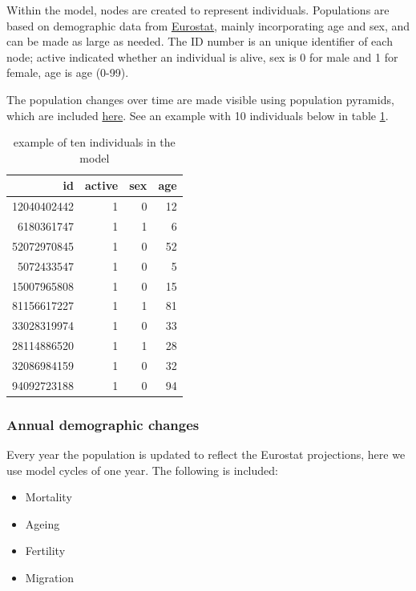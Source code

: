 \documentclass[
]{article}
\begin{document}
Within the model, nodes are created to represent individuals. Populations are based on demographic data from \href{https://ec.europa.eu/eurostat/home}{Eurostat}, mainly incorporating age and sex, and can be made as large as needed. The ID number is an unique identifier of each node; active indicated whether an individual is alive, sex is 0 for male and 1 for female, age is age (0-99).

The population changes over time are made visible using population pyramids, which are included \protect\hyperlink{res_demographics}{here}. See an example with 10 individuals below in table \ref{tab:node-example}.

\begin{table}

\caption{\label{tab:node-example}example of ten individuals in the model}
\centering
\begin{tabular}[t]{r|r|r|r}
\hline
id & active & sex & age\\
\hline
12040402442 & 1 & 0 & 12\\
\hline
6180361747 & 1 & 1 & 6\\
\hline
52072970845 & 1 & 0 & 52\\
\hline
5072433547 & 1 & 0 & 5\\
\hline
15007965808 & 1 & 0 & 15\\
\hline
81156617227 & 1 & 1 & 81\\
\hline
33028319974 & 1 & 0 & 33\\
\hline
28114886520 & 1 & 1 & 28\\
\hline
32086984159 & 1 & 0 & 32\\
\hline
94092723188 & 1 & 0 & 94\\
\hline
\end{tabular}
\end{table}

\hypertarget{annual-demographic-changes}{%
\subsubsection{Annual demographic changes}\label{annual-demographic-changes}}

Every year the population is updated to reflect the Eurostat projections, here we use model cycles of one year. The following is included:

\begin{itemize}
\item
  Mortality
\item
  Ageing
\item
  Fertility
\item
  Migration
\end{itemize}
\end{document}
